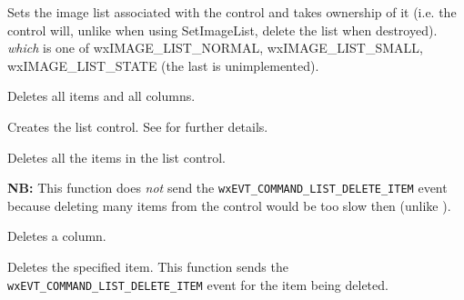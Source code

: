 \label{wxlistctrlassignimagelist}


Sets the image list associated with the control and
takes ownership of it (i.e. the control will, unlike when using
SetImageList, delete the list when destroyed). {\it which} is one of
wxIMAGE\_LIST\_NORMAL, wxIMAGE\_LIST\_SMALL, wxIMAGE\_LIST\_STATE (the last is unimplemented).




\label{wxlistctrlclearall}


Deletes all items and all columns.


\label{wxlistctrlcreate}


Creates the list control. See  for further details.


\label{wxlistctrldeleteallitems}


Deletes all the items in the list control.

{\bf NB:} This function does {\it not} send the
{\tt wxEVT\_COMMAND\_LIST\_DELETE\_ITEM} event because deleting many items
from the control would be too slow then (unlike ).


\label{wxlistctrldeletecolumn}


Deletes a column.


\label{wxlistctrldeleteitem}


Deletes the specified item. This function sends the
{\tt wxEVT\_COMMAND\_LIST\_DELETE\_ITEM} event for the item being deleted.

